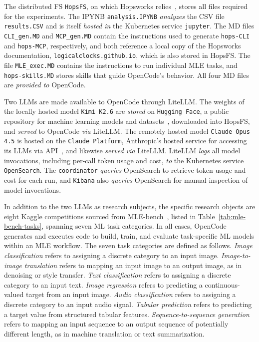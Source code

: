 \documentclass[
english,                 %
bibtex,                  %
includeExtraAbstracts, %
]{kththesis}
\numberwithin{listing}{chapter}
\begin{document}
The distributed \gls{FS} \texttt{Hops\gls{FS}}, on which Hopsworks relies~\cite{de_la_rua_martinez_hopsworks_2024}, stores all files required for the experiments. The \gls{IPYNB} \texttt{analysis.\gls{IPYNB}} \emph{analyzes} the \gls{CSV} file \texttt{results.\gls{CSV}} and is itself \emph{hosted in} the Kubernetes service \texttt{jupyter}. The \gls{MD} files \texttt{CLI\_gen.\gls{MD}} and \texttt{MCP\_gen.\gls{MD}} contain the instructions used to generate \texttt{hops-\gls{CLI}} and \texttt{hops-\gls{MCP}}, respectively, and both reference a local copy of the Hopsworks documentation, \texttt{logicalclocks.github.io}, which is also stored in Hops\gls{FS}. The file \texttt{MLE\_exec.\gls{MD}} contains the instructions to run individual \gls{MLE} tasks, and \texttt{hops-skills.\gls{MD}} stores skills that guide OpenCode's behavior. All four \gls{MD} files are \emph{provided to} OpenCode.

Two \glspl{LLM} are made available to OpenCode through Lite\gls{LLM}. The weights of the locally hosted model \texttt{Kimi K2.6} are \emph{stored} on \texttt{Hugging Face}, a public repository for machine learning models and datasets~\cite{hugging_face_inc_hugging_2026}, downloaded into Hops\gls{FS}, and \emph{served} to OpenCode \emph{via} Lite\gls{LLM}. The remotely hosted model \texttt{Claude Opus 4.5} is hosted on the \texttt{Claude Platform}, Anthropic's hosted service for accessing its \glspl{LLM} via \gls{API}~\cite{anthropic_pbc_claude_2026}, and likewise \emph{served via} Lite\gls{LLM}. Lite\gls{LLM} \emph{logs} all model invocations, including per-call token usage and cost, \emph{to} the Kubernetes service \texttt{OpenSearch}. The \texttt{coordinator} \emph{queries} OpenSearch to retrieve token usage and cost for each run, and \texttt{Kibana} also \emph{queries} OpenSearch for manual inspection of model invocations.

In addition to the two \glspl{LLM} as research subjects, the specific research objects are eight Kaggle competitions sourced from \gls{MLE}-bench~\cite{chan_mle-bench_2025}, listed in Table~\ref{tab:mle-bench-tasks}, spanning seven \gls{ML} task categories. In all cases, OpenCode generates and executes code to build, train, and evaluate task-specific \gls{ML} models within an \gls{MLE} workflow. The seven task categories are defined as follows. \emph{Image classification} refers to assigning a discrete category to an input image. \emph{Image-to-image translation} refers to mapping an input image to an output image, as in denoising or style transfer. \emph{Text classification} refers to assigning a discrete category to an input text. \emph{Image regression} refers to predicting a continuous-valued target from an input image. \emph{Audio classification} refers to assigning a discrete category to an input audio signal. \emph{Tabular prediction} refers to predicting a target value from structured tabular features. \emph{Sequence-to-sequence generation} refers to mapping an input sequence to an output sequence of potentially different length, as in machine translation or text summarization.
\end{document}
